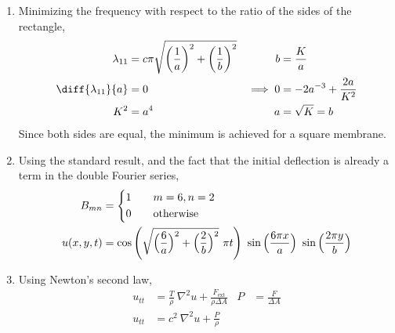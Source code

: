 \begin{enumerate}
    \item Minimizing the frequency with respect to the ratio of the sides of the
          rectangle,
          \begin{align}
              \lambda_{11}                  & = c\pi
              \sqrt{\left(\frac{1}{a}\right)^2 +
              \left( \frac{1}{b} \right)^2} &
              b                             & = \frac{K}{a}                 \\
              \diff {\lambda_{11}}{a}       & = 0                         &
              \implies 0                    & = -2a^{-3} + \frac{2a}{K^2}   \\
              K^2                           & = a^4                       &
              a                             & = \sqrt{K} = b
          \end{align}
          Since both sides are equal, the minimum is achieved for a square membrane.

    \item Using the standard result, and the fact that the initial deflection is already
          a term in the double Fourier series,
          \begin{align}
              B_{mn}   & = \begin{dcases}
                               1 & \quad m=6, n=2         \\
                               0 & \quad \text{otherwise}
                           \end{dcases}                   \\
              u(x,y,t) & = \cos\Bigg( \sqrt{\Big( \frac{6}{a} \Big)^2 +
                  \Big( \frac{2}{b} \Big)^2}\ \pi t \Bigg)\ \sin \Big( \frac{6\pi x}{a}
              \Big)\ \sin\Big( \frac{2\pi y}{b} \Big)
          \end{align}

    \item Using Newton's second law,
          \begin{align}
              u_{tt}                                 & = \frac{T}{\rho}\ \nabla^2 u
              + \frac{F_{\text{ext}}}{\rho \Delta A} &
              P                                      & = \frac{F}{\Delta A}         \\
              u_{tt}                                 & = c^2\ \nabla^2 u
              + \frac{P}{\rho}
          \end{align}
\end{enumerate}